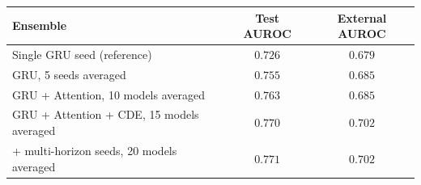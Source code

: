 \begin{tabular}{lcc}
\toprule
Ensemble & Test AUROC & External AUROC \\
\midrule
Single GRU seed (reference) & $0.726$ & $0.679$ \\
GRU, 5 seeds averaged & $0.755$ & $0.685$ \\
GRU + Attention, 10 models averaged & $0.763$ & $0.685$ \\
GRU + Attention + CDE, 15 models averaged & $0.770$ & $\mathbf{0.702}$ \\
+ multi-horizon seeds, 20 models averaged & $0.771$ & $0.702$ \\
\bottomrule
\end{tabular}
